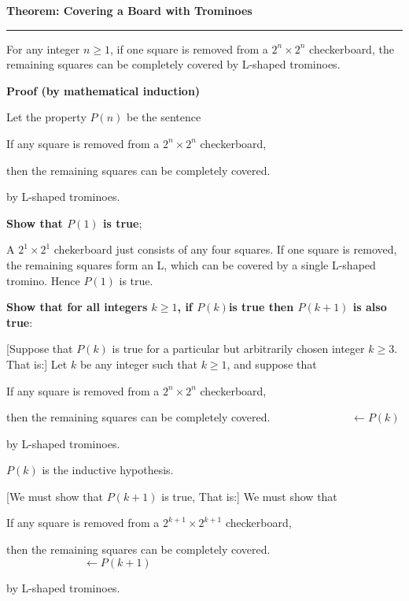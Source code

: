 \nopagenumbers
{\bf Theorem: Covering a Board with Trominoes}
\vskip 1mm
\hrule

\vskip 6pt
For any integer $n\geq 1$, if one square is removed from a $2^n\times 2^n$ checkerboard, the remaining squares can be completely covered by L-shaped trominoes.

\vskip 10pt
{\bf Proof (by mathematical induction)}

\vskip 6pt
Let the property $P(n)$ be the sentence

\vskip 1mm
\centerline{If any square is removed from a $2^n\times 2^n$ checkerboard,}

\vskip 1mm
\centerline{then the remaining squares can be completely covered.}

\vskip 1mm
\centerline{by L-shaped trominoes.}

\vskip 6pt
{\bf Show that $P(1)$ is true};

\vskip 1mm
A $2^1\times 2^1$ chekerboard just consists of any four squares. If one square is removed, the remaining squares form an L, which can be covered by a single L-shaped tromino. Hence $P(1)$ is true.

\vskip 1pc
{\bf Show that for all integers $k\geq 1$, if $P(k)$is true then $P(k+1)$ is also true}:

\vskip 1mm
[Suppose that $P(k)$ is true for a particular but arbitrarily chosen integer $k\geq 3$. That is:] Let $k$ be any integer such that $k\geq 1$, and suppose that

\vskip 1mm
\centerline{If any square is removed from a $2^n\times 2^n$ checkerboard,}

\vskip 2mm
\centerline{then the remaining squares can be completely covered. $\quad\quad\quad\quad\quad\quad\quad\longleftarrow P(k)$}

\vskip 1mm
\centerline{by L-shaped trominoes.}

\vskip 3mm
$P(k)$ is the inductive hypothesis.

\vskip 1mm
[We must show that $P(k+1)$ is true, That is:] We must show that

\vskip 2mm
\centerline{If any square is removed from a $2^{k+1}\times 2^{k+1}$ checkerboard,}

\vskip 1mm
\centerline{then the remaining squares can be completely covered. $\quad\quad\quad\quad\quad\quad\quad\longleftarrow P(k+1)$}

\vskip 1mm
\centerline{by L-shaped trominoes.}

